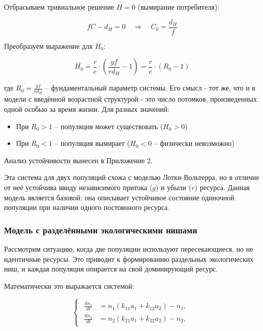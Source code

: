 \documentclass[a4paper, 14pt]{extarticle}
\begin{document}
Отбрасываем тривиальное решение $H = 0$ (вымирание потребителя):

\begin{equation}
    f C - d_H = 0 \quad \Rightarrow \quad C_0 = \frac{d_H}{f}
    \label{eq:C0}
\end{equation}

Преобразуем выражение для $H_0$:

\begin{equation}
    H_0 = \frac{r}{e} \cdot \left( \frac{g f}{r d_H} - 1 \right) = \frac{r}{e} \cdot (R_0 - 1)
    \label{eq:H0}
\end{equation}

где $R_0 = \frac{g f}{r d_H}$ -- фундаментальный параметр системы. Его смысл - тот же, что и в модели с введённой возрастной структурой - это число потомков, произведенных одной особью за время жизни. Для разных значений:

\begin{itemize}
    \item При $R_0 > 1$ -- популяция может существовать ($H_0 > 0$)
    \item При $R_0 < 1$ -- популяция вымирает ($H_0 < 0$ -- физически невозможно)
\end{itemize}

Анализ устойчивости вынесен в Приложение 2.

Эта система для двух популяций схожа с моделью Лотки-Вольтерра, но в отличие от неё устойчива ввиду независимого притока ($g$) и убыли ($r$) ресурса. Данная модель является базовой: она описывает устойчивое состояние одиночной популяции при наличии одного постоянного ресурса.

\subsubsection{Модель с разделёнными экологическими нишами}

Рассмотрим ситуацию, когда две популяции используют пересекающиеся, 
но не идентичные ресурсы. Это приводит к формированию раздельных 
экологических ниш, и каждая популяция опирается на свой доминирующий 
ресурс.

Математически это выражается системой:

\begin{equation}
\begin{cases}
\begin{aligned}
\frac{dn_1}{dt} &= n_1 (k_{11} a_1 + k_{12} a_2) - n_1, \\
\frac{dn_2}{dt} &= n_2 (k_{21} a_1 + k_{22} a_2) - n_2,
\end{aligned}
\end{cases}
\label{eq:separate_niche_pop}
\end{equation}
\end{document}
